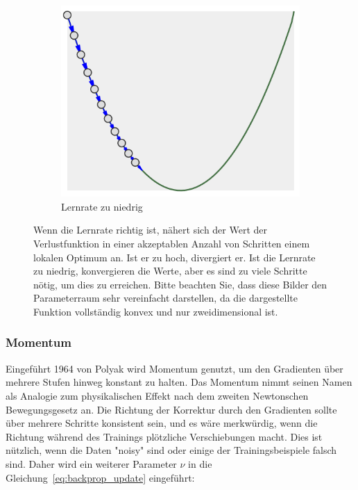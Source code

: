 \begin{figure}
\begin{subfigure}[b]{0.3\textwidth}
        \includegraphics[width=\textwidth]{images/lr_too_low.png}
        \caption{Lernrate zu niedrig}
        \label{fig:lr_too-low}
    \end{subfigure}
    \caption{Wenn die Lernrate richtig ist, nähert sich der Wert der Verlustfunktion in einer akzeptablen Anzahl von Schritten einem lokalen Optimum an.
    Ist er zu hoch, divergiert er.
    Ist die Lernrate zu niedrig, konvergieren die Werte, aber es sind zu viele Schritte nötig, um dies zu erreichen.
    Bitte beachten Sie, dass diese Bilder den Parameterraum sehr vereinfacht darstellen, da die dargestellte Funktion vollständig konvex und nur zweidimensional ist.}
    \label{fig:learning_rate}
\end{figure}

\subsubsection{Momentum}

Eingeführt 1964 von Polyak \cite{Polyak1964} wird Momentum genutzt, um den Gradienten über mehrere Stufen hinweg konstant zu halten.
Das Momentum nimmt seinen Namen als Analogie zum physikalischen Effekt nach dem zweiten Newtonschen Bewegungsgesetz an.
Die Richtung der Korrektur durch den Gradienten sollte über mehrere Schritte konsistent sein, und es wäre merkwürdig, wenn die Richtung während des Trainings plötzliche Verschiebungen macht.
Dies ist nützlich, wenn die Daten "noisy" sind oder einige der Trainingsbeispiele falsch sind.
Daher wird ein weiterer Parameter $\nu$ in die Gleichung~\eqref{eq:backprop_update} eingeführt:


